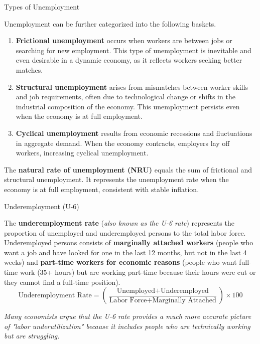 \documentclass[10pt]{article}
\begin{document}
    \begin{core}{Types of Unemployment}

      Unemployment can be further categorized into the following baskets.

      \begin{enumerate}

        \item \textbf{Frictional unemployment} occurs when workers are between jobs or searching for new employment. This type of unemployment is inevitable and even desirable in a dynamic economy, as it reflects workers seeking better matches.

        \item \textbf{Structural unemployment} arises from mismatches between worker skills and job requirements, often due to technological change or shifts in the industrial composition of the economy. This unemployment persists even when the economy is at full employment.

        \item \textbf{Cyclical unemployment} results from economic recessions and fluctuations in aggregate demand. When the economy contracts, employers lay off workers, increasing cyclical unemployment.

      \end{enumerate}

      The \textbf{natural rate of unemployment (NRU)} equals the sum of frictional and structural unemployment. It represents the unemployment rate when the economy is at full employment, consistent with stable inflation.

    \end{core}

    \begin{core}{Underemployment (U-6)}

      The \textbf{underemployment rate} (\textit{also known as the U-6 rate}) represents the proportion of unemployed and underemployed persons to the total labor force. Underemployed persons consists of \textbf{marginally attached workers} (people who want a job and have looked for one in the last 12 months, but not in the last 4 weeks) and \textbf{part-time workers for economic reasons} (people who want full-time work (35+ hours) but are working part-time because their hours were cut or they cannot find a full-time position).
      \[
      \text{Underemployment Rate} = \left( \frac{\text{Unemployed} + \text{Underemployed}}{\text{Labor Force} + \text{Marginally Attached}} \right) \times 100
      \]

      \textit{Many economists argue that the U-6 rate provides a much more accurate picture of "labor underutilization" because it includes people who are technically working but are struggling.}
 
    \end{core}
\end{document}
